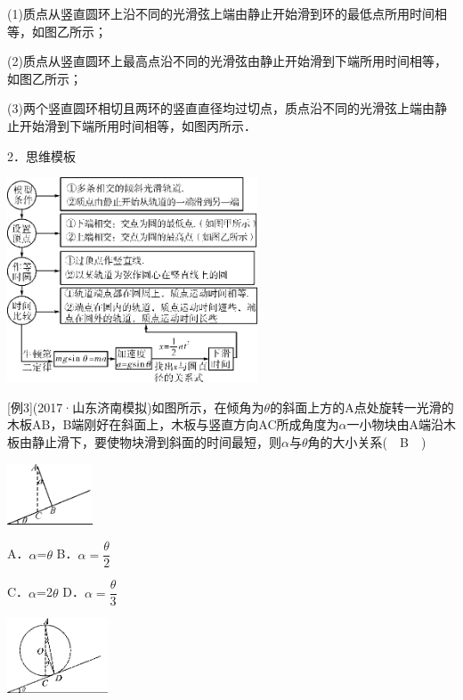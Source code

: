 (1)质点从竖直圆环上沿不同的光滑弦上端由静止开始滑到环的最低点所用时间相等，如图乙所示；

(2)质点从竖直圆环上最高点沿不同的光滑弦由静止开始滑到下端所用时间相等，如图乙所示；

(3)两个竖直圆环相切且两环的竖直直径均过切点，质点沿不同的光滑弦上端由静止开始滑到下端所用时间相等，如图丙所示．

2．思维模板

\begin{center}\includegraphics[width=2.92708in,height=2.39583in]{media/image108.png}\end{center}

{[}例3{]}(2017·山东济南模拟)如图所示，在倾角为$\theta$的斜面上方的A点处旋转一光滑的木板AB，B端刚好在斜面上，木板与竖直方向AC所成角度为$\alpha$一小物块由A端沿木板由静止滑下，要使物块滑到斜面的时间最短，则$\alpha$与$\theta$角的大小关系(　B　)

\begin{center}\includegraphics[width=1in,height=0.71875in]{media/image109.png}\end{center}

A．$\alpha$=$\theta$ B．$\alpha=\dfrac{\theta}{2}$

C．$\alpha$=2$\theta$ D．$\alpha=\dfrac{\theta}{3}$

\begin{center}\includegraphics[width=1.17708in,height=0.875in]{media/image110.png}\end{center}
\newpage
